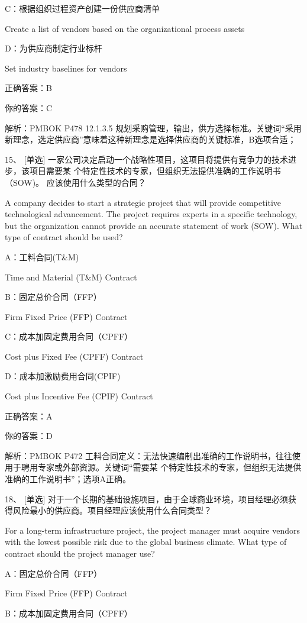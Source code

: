 C：根据组织过程资产创建一份供应商清单

Create a list of vendors based on the organizational process assets

D：为供应商制定行业标杆

Set industry baselines for vendors

正确答案：B

你的答案：C

解析：PMBOK P478 12.1.3.5 规划采购管理，输出，供方选择标准。关键词“采用新理念，选定供应商”意味着这种新理念是选择供应商的关键标准，B选项合适；

15、 [单选] 一家公司决定启动一个战略性项目，这项目将提供有竞争力的技术进步，该项目需要某 个特定性技术的专家，但组织无法提供准确的工作说明书（SOW)。 应该使用什么类型的合同？

A company decides to start a strategic project that will provide competitive technological advancement. The project requires experts in a specific technology, but the organization cannot provide an accurate statement of work (SOW). What type of contract should be used?

A：工料合同(T\&M)

Time and Material (T\&M) Contract

B：固定总价合同（FFP）

Firm Fixed Price (FFP) Contract

C：成本加固定费用合同（CPFF）

Cost plus Fixed Fee (CPFF) Contract

D：成本加激励费用合同(CPIF)

Cost plus Incentive Fee (CPIF) Contract

正确答案：A

你的答案：D

解析：PMBOK P472 工料合同定义：无法快速编制出准确的工作说明书，往往使用于聘用专家或外部资源。关键词“需要某 个特定性技术的专家，但组织无法提供准确的工作说明书”；选项A正确。

18、 [单选] 对于一个长期的基础设施项目，由于全球商业环境，项目经理必须获得风险最小的供应商。项目经理应该使用什么合同类型？

For a long-term infrastructure project, the project manager must acquire vendors with the lowest possible risk due to the global business climate. What type of contract should the project manager use?

A：固定总价合同（FFP）

Firm Fixed Price (FFP) Contract

B：成本加固定费用合同（CPFF）

